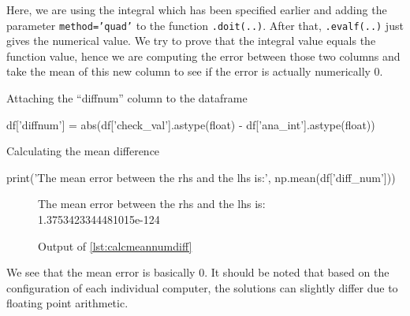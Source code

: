 \noindent
Here, we are using the integral which has been specified earlier and adding the parameter \texttt{method='quad'} to the function \texttt{.doit(..)}.
After that, \texttt{.evalf(..)} just gives the numerical value.
We try to prove that the integral value equals the function value, hence we are computing the error between those two columns and take the mean of this new column to see if the error is actually numerically 0.
\begin{listing}[!ht]
    \caption{Attaching the \enquote{diffnum} column to the dataframe}
    \label{lst:attachdiffnumtodataframe}
    \begin{pythoncode}
        df['diffnum'] = abs(df['check_val'].astype(float) - df['ana_int'].astype(float))
    \end{pythoncode}
\end{listing}
\begin{listing}[!ht]
    \caption{Calculating the mean difference}
    \label{lst:calcmeannumdiff}
    \begin{pythoncode}
        print('The mean error between the rhs and the lhs is:', np.mean(df['diff_num']))
    \end{pythoncode}
\end{listing}
\begin{figure}[!ht]
    \centering
    \caption{Output of \cref{lst:calcmeannumdiff}}
    \label{fig:calcmeannumdiffout}
    The mean error between the rhs and the lhs is: 1.3753423344481015e-124
\end{figure}

\noindent
We see that the mean error is basically 0.
It should be noted that based on the configuration of each individual computer, the solutions can slightly differ due to floating point arithmetic.